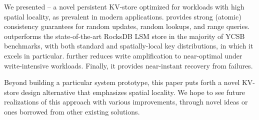 We presented \sys\/ -- a novel persistent KV-store optimized for workloads with high spatial locality, as prevalent in modern %
applications. \sys\/ provides strong (atomic) consistency guarantees for random updates, random lookups, and range queries. 
\sys\/ outperforms the state-of-the-art RocksDB LSM store  in the  majority of YCSB benchmarks, with both 
standard and spatially-local key distributions, in which it excels in particular. \sys\/ further reduces write amplification to near-optimal under write-intensive 
workloads. Finally, it provides near-instant recovery from failures.

Beyond building a particular system prototype, this paper puts forth a novel KV-store design alternative that emphasizes spatial locality. We hope to see future realizations of this approach with various improvements, through novel ideas or ones borrowed from other existing solutions. 
